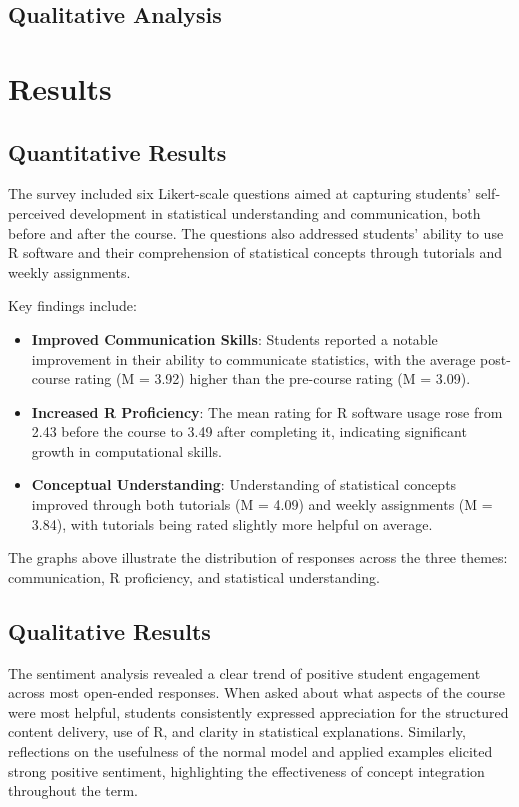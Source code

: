 \documentclass[
  letterpaper,
  DIV=11,
  numbers=noendperiod]{scrartcl}
\providecommand{\tightlist}{%
  \setlength{\itemsep}{0pt}\setlength{\parskip}{0pt}}\usepackage{longtable,booktabs,array}
\begin{document}
\subsection{Qualitative Analysis}\label{qualitative-analysis}

\section{Results}\label{results}

\subsection{Quantitative Results}\label{quantitative-results}

The survey included six Likert-scale questions aimed at capturing
students' self-perceived development in statistical understanding and
communication, both before and after the course. The questions also
addressed students' ability to use R software and their comprehension of
statistical concepts through tutorials and weekly assignments.

Key findings include:

\begin{itemize}
\tightlist
\item
  \textbf{Improved Communication Skills}: Students reported a notable
  improvement in their ability to communicate statistics, with the
  average post-course rating (M = 3.92) higher than the pre-course
  rating (M = 3.09).
\item
  \textbf{Increased R Proficiency}: The mean rating for R software usage
  rose from 2.43 before the course to 3.49 after completing it,
  indicating significant growth in computational skills.
\item
  \textbf{Conceptual Understanding}: Understanding of statistical
  concepts improved through both tutorials (M = 4.09) and weekly
  assignments (M = 3.84), with tutorials being rated slightly more
  helpful on average.
\end{itemize}

The graphs above illustrate the distribution of responses across the
three themes: communication, R proficiency, and statistical
understanding.

\subsection{Qualitative Results}\label{qualitative-results}

The sentiment analysis revealed a clear trend of positive student
engagement across most open-ended responses. When asked about what
aspects of the course were most helpful, students consistently expressed
appreciation for the structured content delivery, use of R, and clarity
in statistical explanations. Similarly, reflections on the usefulness of
the normal model and applied examples elicited strong positive
sentiment, highlighting the effectiveness of concept integration
throughout the term.
\end{document}
